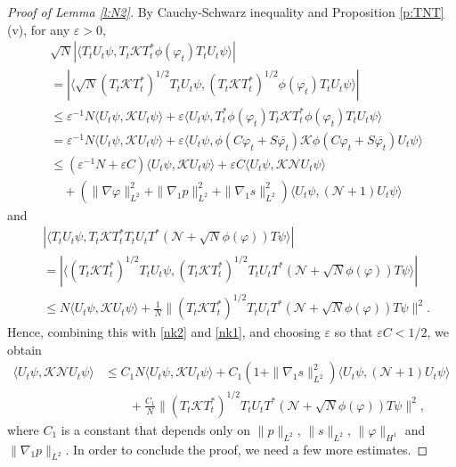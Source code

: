 \documentclass[11pt,a4paper]{scrartcl}
\newcommand{\N}{\mathcal{N}}
\newcommand{\K}{\mathcal{K}}
\begin{document}
\begin{proof}[Proof of Lemma \ref{l:N2}]
  By Cauchy-Schwarz inequality and Proposition \ref{p:TNT}(v), for any
  $\varepsilon > 0$,
  \begin{align*}
    & \sqrt{N} | \langle T_t U_t \psi, T_t \K T_t^* \phi(\varphi_t) T_t U_t
    \psi \rangle | \\
    & = | \langle \sqrt{N} (T_t \K T_t^*)^{1/2} T_t U_t \psi, (T_t \K
    T_t^*)^{1/2} \phi(\varphi_t) T_t U_t \psi \rangle | \\
    & \le \varepsilon^{-1} N \langle U_t \psi, \K U_t \psi \rangle +
    \varepsilon \langle U_t \psi, T_t^* \phi(\varphi_t) T_t \K T_t^*
    \phi(\varphi_t) T_t U_t \psi \rangle \\
    & = \varepsilon^{-1} N \langle U_t \psi, \K U_t \psi \rangle +
    \varepsilon \langle U_t \psi, \phi(C \varphi_t + S \overline{\varphi_t})
    \K \phi(C \varphi_t + S \overline{\varphi_t}) U_t \psi \rangle \\
    & \le ( \varepsilon^{-1} N + \varepsilon C) \langle U_t \psi, \K U_t \psi
    \rangle + \varepsilon C \langle U_t \psi, \K \N U_t \psi \rangle \\
    & \quad + ( \| \nabla \varphi \|_{L^2}^2 + \| \nabla_1 p \|_{L^2}^2 + \|
    \nabla_1 s \|_{L^2}^2) \langle U_t \psi, (\N + 1) U_t \psi \rangle
  \end{align*}
  and
  \begin{align*}
    & | \langle T_t U_t \psi, T_t \K T_t^* T_t U_t T^* (\N + \sqrt{N}
    \phi(\varphi) ) T \psi \rangle| \\
    & = | \langle (T_t \K T_t^*)^{1/2} T_t U_t \psi, (T_t \K T_t^*)^{1/2} T_t
    U_t T^* (\N + \sqrt{N} \phi(\varphi) ) T \psi \rangle| \\
    & \le N \langle U_t \psi, \K U_t \psi \rangle + \frac{1}{N} \| (T_t \K
    T_t^*)^{1/2} T_t U_t T^* ( \N + \sqrt{N} \phi(\varphi) ) T \psi \|^2.
  \end{align*}
  Hence, combining this with \eqref{nk2} and \eqref{nk1}, and choosing
  $\varepsilon$ so that $\varepsilon C < 1/2$, we obtain
  \begin{equation}
    \label{nk3}
    \begin{split}
      \langle U_t \psi, \K \N U_t \psi \rangle & \le C_1 N \langle U_t \psi,
      \K U_t \psi \rangle + C_1 (1 + \| \nabla_1 s \|_{L^2}^2) \langle U_t
      \psi, (\N+1) U_t \psi \rangle \\
      & \qquad + \frac{C_1}{N} \| (T_t \K T_t^*)^{1/2} T_t U_t T^* ( \N +
      \sqrt{N} \phi(\varphi) ) T \psi \|^2,
    \end{split}
  \end{equation}
  where $C_1$ is a constant that depends only on $\| p \|_{L^2}$, $\| s
  \|_{L^2}$, $\| \varphi \|_{H^1}$ and $\| \nabla_1 p \|_{L^2}$. In order to
  conclude the proof, we need a few more estimates.


\end{proof}
\end{document}

